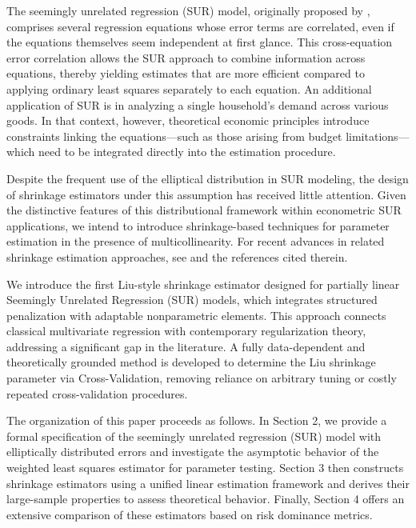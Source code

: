\documentclass{article}
\begin{document}
The seemingly unrelated regression (SUR) model, originally proposed by \cite{Zellner1962}, comprises several regression equations whose error terms are correlated, even if the equations themselves seem independent at first glance. This cross-equation error correlation allows the SUR approach to combine information across equations, thereby yielding estimates that are more efficient compared to applying ordinary least squares separately to each equation. An additional application of SUR is in analyzing a single household's demand across various goods. In that context, however, theoretical economic principles introduce constraints linking the equations—such as those arising from budget limitations—which need to be integrated directly into the estimation procedure.
	
Despite the frequent use of the elliptical distribution in SUR modeling, the design of shrinkage estimators under this assumption has received little attention. Given the distinctive features of this distributional framework within econometric SUR applications, we intend to introduce shrinkage-based techniques for parameter estimation in the presence of multicollinearity. For recent advances in related shrinkage estimation approaches, see \cite{Saleh2022} and the references cited therein.

 We introduce the first Liu-style shrinkage estimator designed for partially linear Seemingly Unrelated Regression (SUR) models, which integrates structured penalization with adaptable nonparametric elements. This approach connects classical multivariate regression with contemporary regularization theory, addressing a significant gap in the literature. A fully data-dependent and theoretically grounded method is developed to determine the Liu shrinkage parameter via Cross-Validation, removing reliance on arbitrary tuning or costly repeated cross-validation procedures.

The organization of this paper proceeds as follows. In Section 2, we provide a formal specification of the seemingly unrelated regression (SUR) model with elliptically distributed errors and investigate the asymptotic behavior of the weighted least squares estimator for parameter testing. Section 3 then constructs shrinkage estimators using a unified linear estimation framework and derives their large-sample properties to assess theoretical behavior. Finally, Section 4 offers an extensive comparison of these estimators based on risk dominance metrics.
	
\setcounter{equation}{0}
\end{document}
